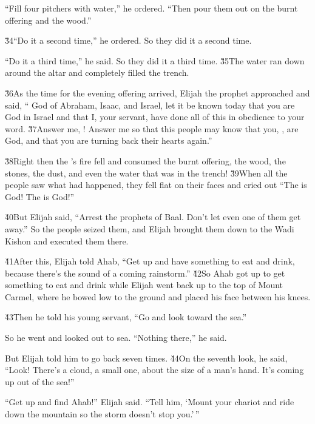 ``Fill four pitchers with water,'' he ordered. ``Then pour them out on the burnt offering and the wood.''

\v{34}``Do it a second time,'' he ordered. So they did it a second time.

``Do it a third time,'' he said. So they did it a third time. \v{35}The water ran down around the altar and completely filled the trench.

\v{36}As the time for the evening offering arrived, Elijah the prophet approached and said, `` God of Abraham, Isaac, and Israel, let it be known today that you are God in Israel and that I, your servant, have done all of this in obedience to your word. \v{37}Answer me, ! Answer me so that this people may know that you, , are God, and that you are turning back their hearts again.''

\v{38}Right then the 's fire fell and consumed the burnt offering, the wood, the stones, the dust, and even the water that was in the trench! \v{39}When all the people saw what had happened, they fell flat on their faces and cried out ``The  is God! The  is God!''

\v{40}But Elijah said, ``Arrest the prophets of Baal. Don't let even one of them get away.'' So the people seized them, and Elijah brought them down to the Wadi Kishon and executed them there.

\v{41}After this, Elijah told Ahab, ``Get up and have something to eat and drink, because there's the sound of a coming rainstorm.'' \v{42}So Ahab got up to get something to eat and drink while Elijah went back up to the top of Mount Carmel, where he bowed low to the ground and placed his face between his knees.

\v{43}Then he told his young servant, ``Go and look toward the sea.''

So he went and looked out to sea. ``Nothing there,'' he said.

But Elijah told him to go back seven times. \v{44}On the seventh look, he said, ``Look! There's a cloud, a small one, about the size of a man's hand. It's coming up out of the sea!''

``Get up and find Ahab!'' Elijah said. ``Tell him, `Mount your chariot and ride down the mountain so the storm doesn't stop you.'\,''

